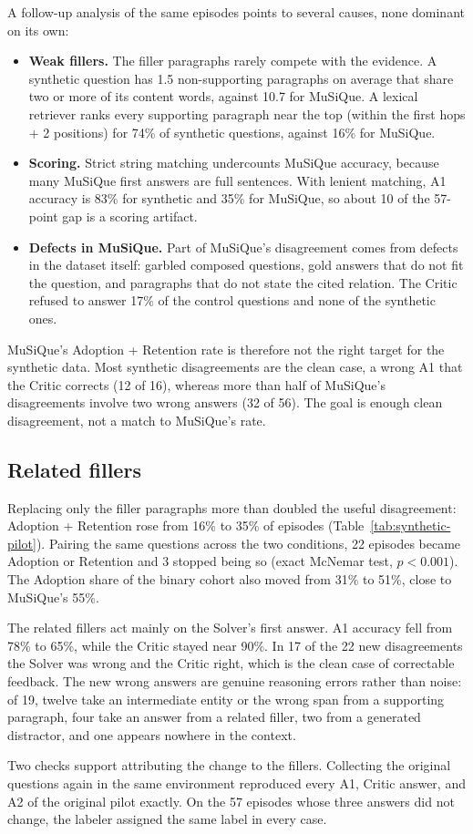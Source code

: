 A follow-up analysis of the same episodes points to several causes, none
dominant on its own:
\begin{itemize}
    \item \textbf{Weak fillers.} The filler paragraphs rarely compete with
    the evidence. A synthetic question has 1.5 non-supporting paragraphs on
    average that share two or more of its content words, against 10.7 for
    MuSiQue. A lexical retriever ranks every supporting paragraph near the
    top (within the first hops + 2 positions) for 74\% of synthetic questions,
    against 16\% for MuSiQue.
    \item \textbf{Scoring.} Strict string matching undercounts MuSiQue
    accuracy, because many MuSiQue first answers are full sentences. With
    lenient matching, A1 accuracy is 83\% for synthetic and 35\% for
    MuSiQue, so about 10 of the 57-point gap is a scoring artifact.
    \item \textbf{Defects in MuSiQue.} Part of MuSiQue's disagreement comes
    from defects in the dataset itself: garbled composed questions, gold
    answers that do not fit the question, and paragraphs that do not state
    the cited relation. The Critic refused to answer 17\% of the control
    questions and none of the synthetic ones.
\end{itemize}

MuSiQue's Adoption + Retention rate is therefore not the right target for
the synthetic data. Most synthetic disagreements are the clean case, a
wrong A1 that the Critic corrects (12 of 16), whereas more than half of
MuSiQue's disagreements involve two wrong answers (32 of 56). The goal is
enough clean disagreement, not a match to MuSiQue's rate.

\subsection{Related fillers}
\label{sec:res-fillers}

Replacing only the filler paragraphs more than doubled the useful
disagreement: Adoption + Retention rose from 16\% to 35\% of episodes
(Table~\ref{tab:synthetic-pilot}). Pairing the same questions across the two
conditions, 22 episodes became Adoption or Retention and 3 stopped being so
(exact McNemar test, $p < 0.001$). The Adoption share of the binary cohort
also moved from 31\% to 51\%, close to MuSiQue's 55\%.

The related fillers act mainly on the Solver's first answer. A1 accuracy fell
from 78\% to 65\%, while the Critic stayed near 90\%. In 17 of the 22 new
disagreements the Solver was wrong and the Critic right, which is the clean
case of correctable feedback. The new wrong answers are genuine reasoning
errors rather than noise: of 19, twelve take an intermediate entity or the
wrong span from a supporting paragraph, four take an answer from a related
filler, two from a generated distractor, and one appears nowhere in the
context.

Two checks support attributing the change to the fillers. Collecting the
original questions again in the same environment reproduced every A1, Critic
answer, and A2 of the original pilot exactly. On the 57 episodes whose three
answers did not change, the labeler assigned the same label in every case.
